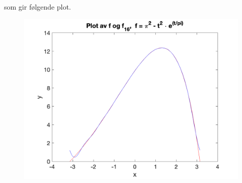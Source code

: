 \documentclass[12pt,
               a4paper,
               article,
               oneside,
               oldfontcommands,
               norsk]{memoir}
\begin{document}
som gir følgende plot.
\begin{figure}[H]
	\centering
	\includegraphics[scale=0.7]{oppgave_8.png} 
\end{figure}
\end{document}
